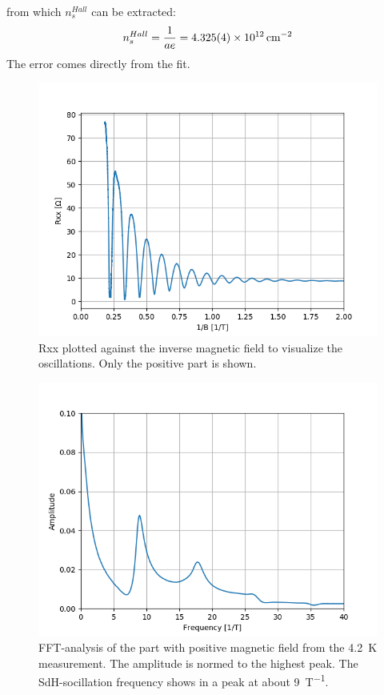 \documentclass[12pt,a4paper]{article}
\begin{document}
from which $n_s^{Hall}$ can be extracted:
\begin{equation}
n_s^{Hall} = \dfrac{1}{a e} = \SI{4.325(4)E12}{cm^{-2}}
\end{equation}
The error comes directly from the fit.
\begin{figure}
\centering
\includegraphics[scale=0.8]{Bilder/inverseB.png}
\caption{Rxx plotted against the inverse magnetic field to visualize the oscillations. Only the positive part is shown.}
\label{fig:n_inverseB}
\end{figure}

\begin{figure}
\centering
\includegraphics[scale=0.8]{Bilder/FFT4_2.png}
\caption{FFT-analysis of the part with positive magnetic field from the \SI{4.2}{K} measurement. The amplitude is normed to the highest peak. The SdH-socillation frequency shows in a peak at about \SI{9}{T^{-1}}.}
\label{fig:n_FFT}
\end{figure}
\end{document}
